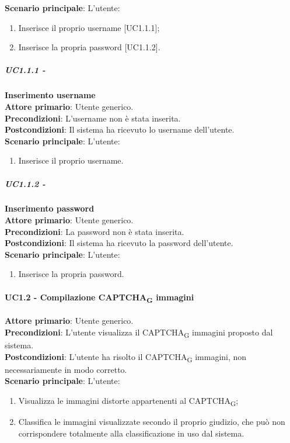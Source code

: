 \textbf{Scenario principale}: L'utente:
\begin{enumerate}
   \item Inserisce il proprio username [UC1.1.1];
   \item Inserisce la propria password [UC1.1.2].
\end{enumerate}

\subparagraph{UC1.1.1 - } \textbf{Inserimento username}\\
\textbf{Attore primario}: Utente generico.\\
\textbf{Precondizioni}: L'username non è stata inserita.\\
\textbf{Postcondizioni}: Il sistema ha ricevuto lo username dell'utente.\\

\textbf{Scenario principale}: L'utente:
\begin{enumerate}
   \item Inserisce il proprio username.
\end{enumerate}

\subparagraph{UC1.1.2 - } \textbf{Inserimento password} \\
\textbf{Attore primario}: Utente generico.\\
\textbf{Precondizioni}: La password non è stata inserita.\\
\textbf{Postcondizioni}: Il sistema ha ricevuto la password dell'utente.\\

\textbf{Scenario principale}: L'utente:
\begin{enumerate}
   \item Inserisce la propria password.
\end{enumerate}

\paragraph{UC1.2 - Compilazione CAPTCHA\textsubscript{G} immagini}
\textbf{Attore primario}: Utente generico.\\
\textbf{Precondizioni}: L'utente visualizza il CAPTCHA\textsubscript{G} immagini proposto dal sistema.\\
\textbf{Postcondizioni}: L'utente ha risolto il CAPTCHA\textsubscript{G} immagini, non necessariamente in modo corretto.\\

\textbf{Scenario principale}: L'utente:
\begin{enumerate}
   \item Visualizza le immagini distorte appartenenti al CAPTCHA\textsubscript{G};
   \item Classifica le immagini visualizzate secondo il proprio giudizio, che può non corrispondere totalmente alla classificazione in uso dal sistema.
\end{enumerate}

